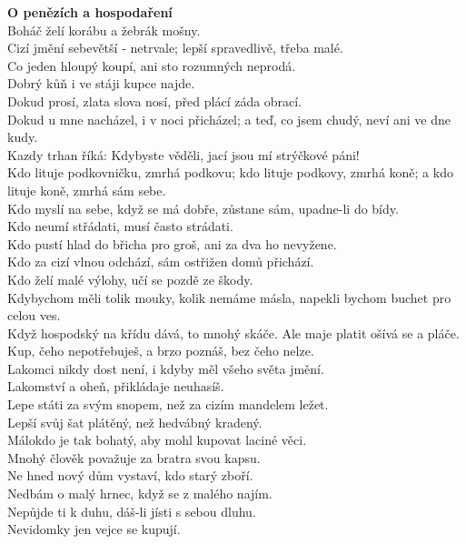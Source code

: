 \begin{multicols}{\value{columnsgames}}
\noindent
{\large\bf O penězích a hospodaření}\\[1 mm]
Boháč želí korábu a žebrák mošny.\\
Cizí jmění sebevětší - netrvale; lepší spravedlivě, třeba malé.\\
Co jeden hloupý koupí, ani sto rozumných neprodá.\\
Dobrý kůň i ve stáji kupce najde.\\
Dokud prosí, zlata slova nosí, před plácí záda obrací.\\
Dokud u mne nacházel, i v noci přicházel; a teď, co jsem chudý, 
neví ani ve dne kudy.\\
Kazdy trhan říká: Kdybyste věděli, jací jsou mí strýčkové páni!\\
Kdo lituje podkovničku, zmrhá podkovu; kdo lituje podkovy, zmrhá 
koně; a kdo lituje koně, zmrhá sám sebe.\\
Kdo myslí na sebe, když se má dobře, zůstane sám, upadne-li do 
bídy.\\
Kdo neumí střádati, musí často strádati.\\
Kdo pustí hlad do břicha pro groš, ani za dva ho nevyžene.\\
Kdo za cizí vlnou odchází, sám ostřižen domů přichází.\\
Kdo želí malé výlohy, učí se pozdě ze škody.\\
Kdybychom měli tolik mouky, kolik nemáme másla, napekli bychom 
buchet pro celou ves.\\
Když hospodský na křídu dává, to mnohý skáče. Ale maje platit 
ošívá se a pláče.\\
Kup, čeho nepotřebuješ, a brzo poznáš, bez čeho nelze.\\
Lakomci nikdy dost není, i kdyby měl všeho světa jmění.\\
Lakomství a oheň, přikládaje neuhasíš.\\
Lepe státi za svým snopem, než za cizím mandelem ležet.\\
Lepší svůj šat plátěný, než hedvábný kradený.\\
Málokdo je tak bohatý, aby mohl kupovat laciné věci.\\
Mnohý člověk považuje za bratra svou kapsu.\\
Ne hned nový dům vystaví, kdo starý zboří.\\
Nedbám o malý hrnec, když se z malého najím.\\
Nepůjde ti k duhu, dáš-li jísti s sebou dluhu.\\
Nevidomky jen vejce se kupují.\\

\end{multicols}
